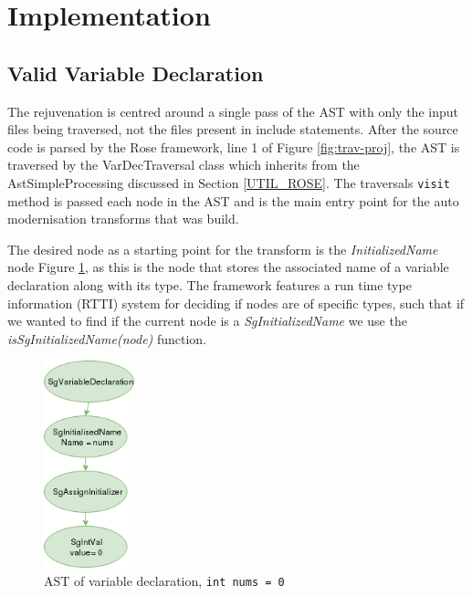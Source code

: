 \documentclass[bsc,frontabs,singlespacing,parskip,deptreport]{infthesis}
\begin{document}
\section{Implementation}\label{sec:auto-Impl}

\subsection{Valid Variable Declaration}
The rejuvenation is centred around a single pass of the AST with only the input files being traversed, not the files present in include statements. After the source code is parsed by the Rose framework, line 1 of Figure \ref{fig:trav-proj}, the AST is traversed by the VarDecTraversal class which inherits from the AstSimpleProcessing discussed in Section \ref{UTIL_ROSE}. The traversals \texttt{visit} method is passed each node in the AST and is the main entry point for the auto modernisation transforms that was build.

The desired node as a starting point for the transform is the \textit{InitializedName} node Figure \ref{fig:var-dec-ast}, as this is the node that stores the associated name of a variable declaration along with its type. The framework features a run time type information (RTTI) system for deciding if nodes are of specific types, such that if we wanted to find if the current node is a \textit{SgInitializedName} we use the \textit{isSgInitializedName(node)} function.

\begin{figure}[H]
    \centering
    \includegraphics[height=6cm]{images/ast-var-dec.png}
    \caption{AST of variable declaration, \texttt{int nums = 0}}
    \label{fig:var-dec-ast}
\end{figure}
\end{document}

